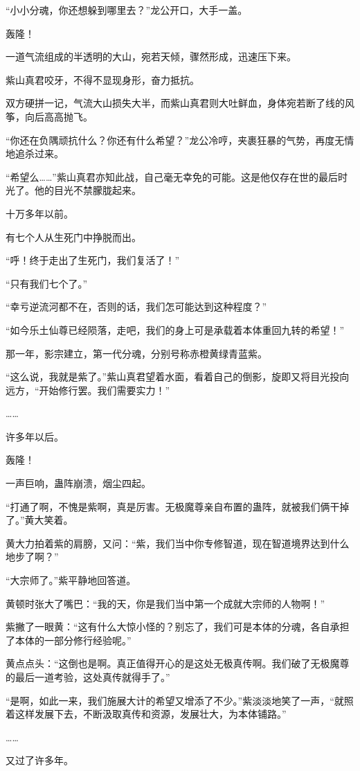 \begin{this_body}
“小小分魂，你还想躲到哪里去？”龙公开口，大手一盖。

轰隆！

一道气流组成的半透明的大山，宛若天倾，骤然形成，迅速压下来。

紫山真君咬牙，不得不显现身形，奋力抵抗。

双方硬拼一记，气流大山损失大半，而紫山真君则大吐鲜血，身体宛若断了线的风筝，向后高高抛飞。

“你还在负隅顽抗什么？你还有什么希望？”龙公冷哼，夹裹狂暴的气势，再度无情地追杀过来。

“希望么……”紫山真君亦知此战，自己毫无幸免的可能。这是他仅存在世的最后时光了。他的目光不禁朦胧起来。

十万多年以前。

有七个人从生死门中挣脱而出。

“呼！终于走出了生死门，我们复活了！”

“只有我们七个了。”

“幸亏逆流河都不在，否则的话，我们怎可能达到这种程度？”

“如今乐土仙尊已经陨落，走吧，我们的身上可是承载着本体重回九转的希望！”

那一年，影宗建立，第一代分魂，分别号称赤橙黄绿青蓝紫。

“这么说，我就是紫了。”紫山真君望着水面，看着自己的倒影，旋即又将目光投向远方，“开始修行罢。我们需要实力！”

……

许多年以后。

轰隆！

一声巨响，蛊阵崩溃，烟尘四起。

“打通了啊，不愧是紫啊，真是厉害。无极魔尊亲自布置的蛊阵，就被我们俩干掉了。”黄大笑着。

黄大力拍着紫的肩膀，又问：“紫，我们当中你专修智道，现在智道境界达到什么地步了啊？”

“大宗师了。”紫平静地回答道。

黄顿时张大了嘴巴：“我的天，你是我们当中第一个成就大宗师的人物啊！”

紫撇了一眼黄：“这有什么大惊小怪的？别忘了，我们可是本体的分魂，各自承担了本体的一部分修行经验呢。”

黄点点头：“这倒也是啊。真正值得开心的是这处无极真传啊。我们破了无极魔尊的最后一道考验，这处真传就得手了。”

“是啊，如此一来，我们施展大计的希望又增添了不少。”紫淡淡地笑了一声，“就照着这样发展下去，不断汲取真传和资源，发展壮大，为本体铺路。”

……

又过了许多年。


\end{this_body}
